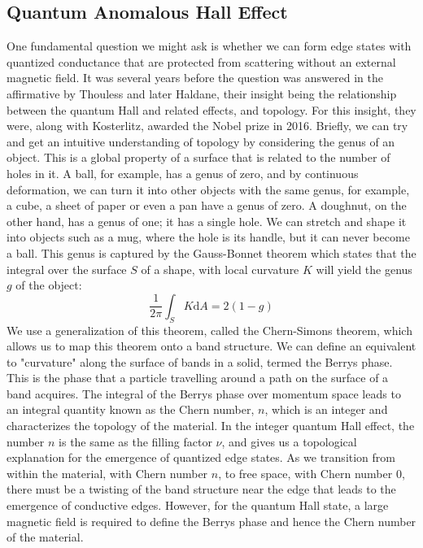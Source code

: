 \subsection{Quantum Anomalous Hall Effect}
One fundamental question we might ask is whether we can form edge states with quantized conductance that are protected from
scattering without an external magnetic field. It was several years before the question was answered in the affirmative by
Thouless\cite{PhysRevLett.49.405} and later Haldane\cite{PhysRevLett.61.2015}, their insight being the relationship between the
quantum Hall and related effects, and topology. For this insight, they were, along with Kosterlitz, awarded the Nobel prize in 2016\cite{nobel2016}.
Briefly, we can try and get an intuitive understanding of topology by considering the genus of an object. This is a global property of
a surface that is related to the number of holes in it. A ball, for example, has a genus of zero, and by continuous deformation, we can turn it
into other objects with the same genus, for example, a cube, a sheet of paper or even a pan have a genus of zero. A doughnut, on the other hand, has
a genus of one; it has a single hole. We can stretch and shape it into objects such as a mug, where the hole is its handle, but it can never become a ball.
This genus is captured by the Gauss-Bonnet theorem which states that the integral over the surface $S$ of a shape, with local curvature $K$ will yield
the genus $g$ of the object:
\begin{equation}
  \frac{1}{2\pi}\int_S K \mathrm{d}A = 2(1-g)
\end{equation}
We use a generalization of this theorem, called the Chern-Simons theorem, which allows us to map this theorem onto a band structure. We can define an
equivalent to "curvature" along the surface of bands in a solid, termed the Berrys phase. This is the phase that a particle travelling around
a path on the surface of a band acquires. The integral of the Berrys phase over momentum space leads to an integral quantity known as the Chern number,
$n$, which is an integer and characterizes the topology of the material\cite{conmatphys-011417}. In the integer quantum Hall effect, the number $n$ is the same as the filling factor $\nu$, and gives us a topological explanation for the emergence of quantized edge states. As we transition from within
the material, with Chern number $n$, to free space, with Chern number $0$, there must be a twisting of the band structure near the edge that leads to the emergence of conductive edges. However, for the quantum Hall state, a large magnetic field is required to define the Berrys phase and hence the Chern number of the material.

